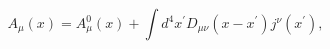 \begin{equation}
A_{\mu }(x)=A_{\mu }^{0}(x)+\int d^{4}x^{\prime }D_{\mu \nu }(x-x^{\prime
})j^{\nu }(x^{\prime }),
\end{equation}

